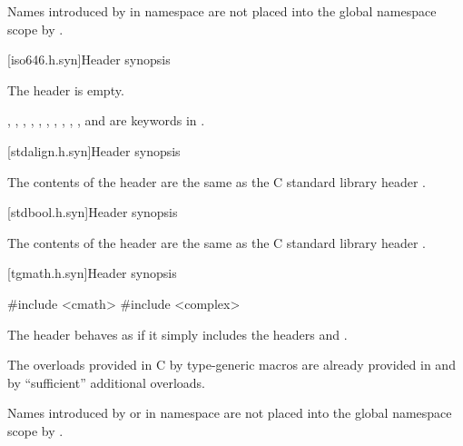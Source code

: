 \pnum
\begin{note}
Names introduced by  in namespace 
are not placed into the global namespace scope by .
\end{note}

[iso646.h.syn]{Header  synopsis}

%
\pnum
The \Cpp{} header  is empty.
\begin{note}
,
,
,
,
,
,
,
,
,
, and
are keywords in \Cpp{}.
\end{note}

[stdalign.h.syn]{Header  synopsis}

%
\pnum
The contents of the \Cpp{} header  are the same as the C
standard library header .


[stdbool.h.syn]{Header  synopsis}

%
\pnum
The contents of the \Cpp{} header  are the same as the C
standard library header .


[tgmath.h.syn]{Header  synopsis}

%
\begin{codeblock}
#include <cmath>
#include <complex>
\end{codeblock}

\pnum
The header 
behaves as if it simply includes the headers
 and
.

\pnum
\begin{note}
The overloads provided in C by type-generic macros
are already provided in  and 
by ``sufficient'' additional overloads.
\end{note}

\pnum
\begin{note}
Names introduced by  or 
in namespace 
are not placed into the global namespace scope by .
\end{note}

